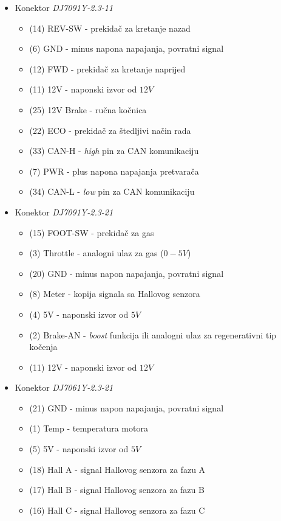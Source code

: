 \begin{itemize}
	\item Konektor \textit{DJ7091Y-2.3-11}
	\begin{itemize}
		\item (14) REV-SW - prekidač za kretanje nazad
		\item (6) GND - minus napona napajanja, povratni signal
		\item (12) FWD - prekidač za kretanje naprijed
		\item (11) 12V - naponski izvor od $12V$
		\item (25) 12V Brake - ručna kočnica
		\item (22) ECO - prekidač za štedljivi način rada
		\item (33) CAN-H - \textit{high} pin za CAN komunikaciju
		\item (7) PWR - plus napona napajanja pretvarača
		\item (34) CAN-L - \textit{low} pin za CAN komunikaciju
	\end{itemize}
	\item Konektor \textit{DJ7091Y-2.3-21}
		\begin{itemize}
		\item (15) FOOT-SW - prekidač za gas
		\item (3) Throttle - analogni ulaz za gas ($0-5V$)
		\item (20) GND - minus napon napajanja, povratni signal
		\item (8) Meter - kopija signala sa Hallovog senzora
		\item (4) 5V - naponski izvor od $5V$
		\item (2) Brake-AN - \textit{boost} funkcija ili analogni ulaz za regenerativni tip kočenja
		\item (11) 12V - naponski izvor od $12V$
	\end{itemize}
	\item Konektor \textit{DJ7061Y-2.3-21}
		\begin{itemize}
		\item (21) GND - minus napon napajanja, povratni signal
		\item (1) Temp - temperatura motora
		\item (5) 5V - naponski izvor od $5V$
		\item (18) Hall A - signal Hallovog senzora za fazu A
		\item (17) Hall B - signal Hallovog senzora za fazu B 
		\item (16) Hall C - signal Hallovog senzora za fazu C 
	\end{itemize}
\end{itemize}

